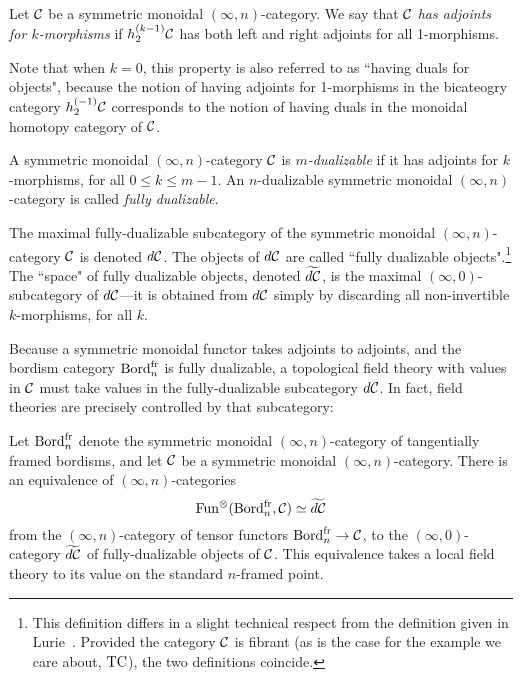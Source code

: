 \documentclass{amsart}
\begin{document}
\begin{appdefinition}
	Let $\mathcal C$ be a symmetric monoidal $(\infty,n)$-category. We say that $\mathcal C$ {\em has adjoints for $k$-morphisms} if $h^{(k-1)}_2 \mathcal C$ has both left and right adjoints for all 1-morphisms. 
\end{appdefinition}

\noindent Note that when $k=0$, this property is also referred to as ``having duals for objects", because the notion of having adjoints for 1-morphisms in the bicateogry category $h^{(-1)}_2 \mathcal C$ corresponds to the notion of having duals in the monoidal homotopy category of $\mathcal C$.

\begin{appdefinition}
A symmetric monoidal $(\infty,n)$-category $\mathcal C$ is \emph{$m$-dualizable} if it has adjoints for $k$-morphisms, for all $0 \leq k \leq m-1$.  An $n$-dualizable symmetric monoidal $(\infty,n)$-category is called \emph{fully dualizable}.
\end{appdefinition}

\noindent The maximal fully-dualizable subcategory of the symmetric monoidal $(\infty,n)$-category $\mathcal C$ is denoted $d\mathcal C$. The objects of $d\mathcal C$ are called ``fully dualizable objects".\footnote{This definition differs in a slight technical respect from the definition given in Lurie~\cite{lurie-ch}.  Provided the category $\mathcal C$ is fibrant (as is the case for the example we care about, $\mathrm{TC}$), the two definitions coincide.}  The ``space" of fully dualizable objects, denoted $\widetilde{d\mathcal C}$, is the maximal $(\infty,0)$-subcategory of $d\mathcal C$---it is obtained from $d\mathcal C$ simply by discarding all non-invertible $k$-morphisms, for all $k$. %

Because a symmetric monoidal functor takes adjoints to adjoints, and the bordism category $\mathrm{Bord}^\mathrm{fr}_n$ is fully dualizable, a topological field theory with values in $\mathcal C$ must take values in the fully-dualizable subcategory $d\mathcal C$.  In fact, field theories are precisely controlled by that subcategory:

\begin{apptheorem}
	Let $\mathrm{Bord}^\mathrm{fr}_n$ denote the symmetric monoidal $(\infty,n)$-category of tangentially framed bordisms, and let $\mathcal C$ be a symmetric monoidal $(\infty,n)$-category.  There is an equivalence of $(\infty,n)$-categories
	\begin{equation*}
		\operatorname{Fun}^\otimes(\mathrm{Bord}^\mathrm{fr}_n, \mathcal C) \simeq \widetilde{d\mathcal C}
	\end{equation*} 
from the $(\infty,n)$-category of tensor functors $\mathrm{Bord}^\mathrm{fr}_n \rightarrow \mathcal C$, to the $(\infty,0)$-category $\widetilde{d\mathcal C}$ of fully-dualizable objects of $\mathcal C$.  This equivalence takes a local field theory to its value on the standard $n$-framed point.	
\end{apptheorem}
\end{document}

